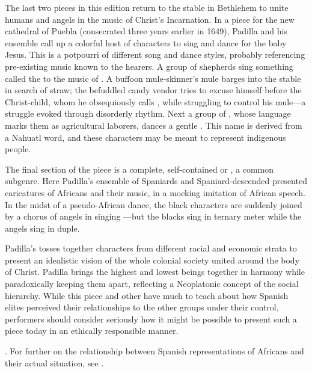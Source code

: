 The last two pieces in this edition return to the stable in Bethlehem to unite 
humans and angels in the music of Christ's Incarnation.
In a piece for the new cathedral of Puebla (consecrated three years earlier in 
1649), Padilla and his ensemble call up a colorful host of characters 
 to sing and dance for the baby Jesus.
This  is a potpourri of different song and dance styles, 
probably referencing pre-existing music known to the hearers.
A group of shepherds sing something called the  to the music 
of .
A buffoon mule-skinner's mule barges into the stable in search of straw; the 
befuddled candy vendor tries to excuse himself before the Christ-child, whom he 
obsequiously calls , while struggling to control his mule---a 
struggle evoked through disorderly rhythm.
Next a group of , whose language marks them as 
agricultural laborers, dances a gentle .
This name is derived from a Nahuatl word, and these characters may be meant to 
represent indigenous people.

The final section of the piece is a complete, self-contained  or 
, a common subgenre.
Here Padilla's ensemble of Spaniards and Spaniard-descended  
presented caricatures of Africans and their music, in a mocking imitation of 
African speech.
In the midst of a pseudo-African dance, the black characters are suddenly 
joined by a chorus of angels in singing ---but the blacks sing in 
ternary meter while the angels sing in duple.

Padilla's  tosses together characters from different 
racial and economic strata to present an idealistic vision of the whole 
colonial society united around the body of Christ.
Padilla brings the highest and lowest beings together in harmony while 
paradoxically keeping them apart, reflecting a Neoplatonic concept of the 
social hierarchy.
While this piece and other  have much to teach 
about how Spanish elites perceived their relationships to the other groups 
under their control, performers should consider seriously how it might be 
possible to present such a piece today in an ethically responsible manner.%
  \begin{Footnote}
      \autocites{Baker:EthnicVC}{Baker:PerformancePostColonial}. 
      For further on the relationship between Spanish representations of Africans 
      and their actual situation, see \autocites{Molinero:Negros}{Lipski:AfroHispanic}
      {Fromont:DancingKingCongo}.
  \end{Footnote}

